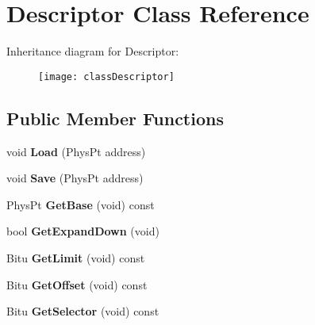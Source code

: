 \hypertarget{classDescriptor}{\section{Descriptor Class Reference}
\label{classDescriptor}
}
Inheritance diagram for Descriptor\-:\begin{figure}[H]
\begin{center}
\leavevmode
\texttt{[image: classDescriptor]}
\end{center}
\end{figure}
\subsection*{Public Member Functions}
\begin{DoxyCompactItemize}
\item 
\hypertarget{classDescriptor_aabcbb01d880277170f2deedd0e3961ee}{void {\bfseries Load} (Phys\-Pt address)}\label{classDescriptor_aabcbb01d880277170f2deedd0e3961ee}

\item 
\hypertarget{classDescriptor_ae4c26f5d86cbb9d4c1ea7ebfd8a74483}{void {\bfseries Save} (Phys\-Pt address)}\label{classDescriptor_ae4c26f5d86cbb9d4c1ea7ebfd8a74483}

\item 
\hypertarget{classDescriptor_a339bcdd474893ff0ddc504db870108a9}{Phys\-Pt {\bfseries Get\-Base} (void) const }\label{classDescriptor_a339bcdd474893ff0ddc504db870108a9}

\item 
\hypertarget{classDescriptor_a0711a0339cd3c310f6d39cbbc53b4a48}{bool {\bfseries Get\-Expand\-Down} (void)}\label{classDescriptor_a0711a0339cd3c310f6d39cbbc53b4a48}

\item 
\hypertarget{classDescriptor_a731ad5da270196796c2f4416e4037969}{Bitu {\bfseries Get\-Limit} (void) const }\label{classDescriptor_a731ad5da270196796c2f4416e4037969}

\item 
\hypertarget{classDescriptor_ad51ba4c54b55be7e3293de816b8c21f6}{Bitu {\bfseries Get\-Offset} (void) const }\label{classDescriptor_ad51ba4c54b55be7e3293de816b8c21f6}

\item 
\hypertarget{classDescriptor_a1ca66889c3c0aeae501c02fdea60c333}{Bitu {\bfseries Get\-Selector} (void) const }\label{classDescriptor_a1ca66889c3c0aeae501c02fdea60c333}


\end{DoxyCompactItemize}
